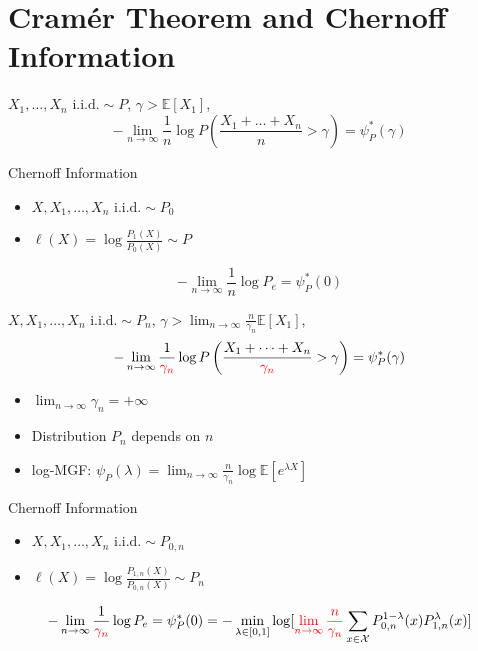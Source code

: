 \documentclass{beamer}
\begin{document}
\section{Cramér Theorem and Chernoff Information}
\begin{frame}
\begin{theorem}
$X_1, \dots, X_n  \textrm{ i.i.d.} \sim P$, $\gamma > \mathbb{E}[X_1]$, 
\begin{equation}
-\lim_{n\to \infty}\frac{1}{n} \log P\left(\frac{X_1+ \dots + X_n}{n} > \gamma \right)
= \psi_P^*(\gamma)
\end{equation}
\end{theorem}
Chernoff Information
\begin{itemize}
\item $X, X_1, \dots, X_n \textrm{ i.i.d.} \sim P_0$
\item $\ell(X) = \log\frac{P_1(X)}{P_0(X)} \sim P$
\end{itemize}
\begin{equation}
-\lim_{n\to\infty} \frac{1}{n}\log P_e = \psi^*_P(0)
\end{equation}
\end{frame}
\begin{frame}
\begin{theorem}
$X, X_1, \dots, X_n  \textrm{ i.i.d.} \sim P_n$, $\gamma > \lim_{n\to\infty} \frac{n}{\gamma_n}\mathbb{E}[X_1]$, 
\begin{equation}
-\lim_{n\to \infty}\frac{1}{\textcolor{red}{\gamma_n}} \log P\left(\frac{X_1+ \dots + X_n}{\textcolor{red}{\gamma_n}} > \gamma \right)
= \psi_P^*(\gamma)
\end{equation}
\begin{itemize}
\item $\lim_{n\to\infty} \gamma_n = +\infty$
\item Distribution $P_n$ depends on $n$
\item log-MGF: $\psi_P(\lambda)=\lim_{n\to\infty} \frac{n}{\gamma_n} \log \mathbb{E}[e^{\lambda X}]$
\end{itemize}
\end{theorem}
Chernoff Information
\begin{itemize}
\item $X, X_1, \dots, X_n \textrm{ i.i.d.} \sim P_{0,n}$
\item $\ell(X) = \log\frac{P_{1,n}(X)}{P_{0,n}(X)} \sim P_n$
\end{itemize}
\begin{equation*}
-\lim_{n\to\infty} \frac{1}{\textcolor{red}{\gamma_n}}\log P_e = \psi^*_P(0)
=-\min_{\lambda\in[0,1]}\log [\textcolor{red}{\lim_{n\to\infty}\frac{n}{\gamma_n}} \sum_{x\in \mathcal{X}} P_{0,n}^{1-\lambda}(x)P_{1,n}^{\lambda}(x)]
\end{equation*}
\end{frame}
\end{document}
